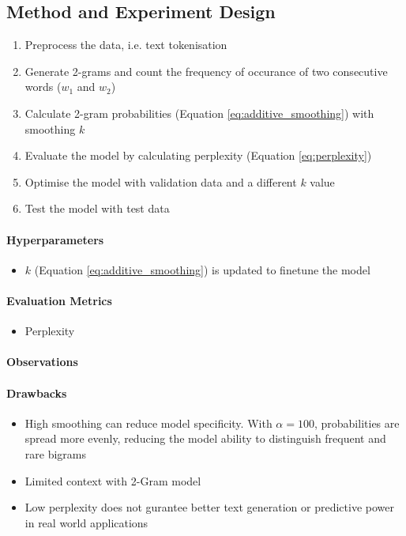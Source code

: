 \subsection*{Method and Experiment Design}

\begin{enumerate}
    \item Preprocess the data, i.e. text tokenisation
    \item Generate 2-grams and count the frequency of occurance of two consecutive words ($w_1$ and $w_2$)
    \item Calculate 2-gram probabilities (Equation \ref{eq:additive_smoothing}) with smoothing $k$
    \item Evaluate the model by calculating perplexity (Equation \ref{eq:perplexity})
    \item Optimise the model with validation data and a different $k$ value
    \item Test the model with test data
\end{enumerate}



\paragraph{Hyperparameters}
\begin{itemize}
    \item $k$ (Equation \ref{eq:additive_smoothing}) is updated to finetune the model
\end{itemize}

\paragraph{Evaluation Metrics}
\begin{itemize}
    \item Perplexity
\end{itemize}

\paragraph{Observations}




\paragraph{Drawbacks}
\begin{itemize}
    \item High smoothing can reduce model specificity.
    With $\alpha = 100$, probabilities are spread more evenly, reducing the model ability to distinguish frequent and rare bigrams 
    \item Limited context with 2-Gram model
    \item Low perplexity does not gurantee better text generation or predictive power in real world applications
\end{itemize}



